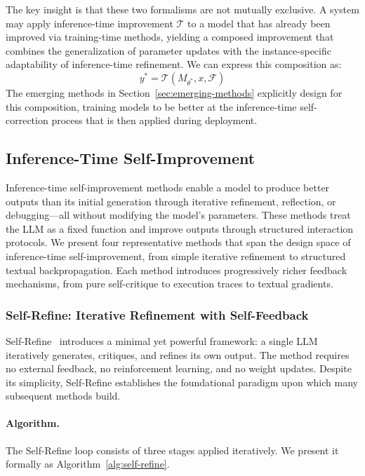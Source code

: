 The key insight is that these two formalisms are not mutually exclusive. A system may apply inference-time improvement $\mathcal{T}$ to a model that has already been improved via training-time methods, yielding a composed improvement that combines the generalization of parameter updates with the instance-specific adaptability of inference-time refinement. We can express this composition as:
\begin{equation}
    y^{*} = \mathcal{T}(M_{\theta^{*}}, x, \mathcal{F})
    \label{eq:composed-improvement}
\end{equation}
The emerging methods in Section~\ref{sec:emerging-methods} explicitly design for this composition, training models to be better at the inference-time self-correction process that is then applied during deployment.


\subsection{Inference-Time Self-Improvement}
\label{sec:inference-time}

Inference-time self-improvement methods enable a model to produce better outputs than its initial generation through iterative refinement, reflection, or debugging---all without modifying the model's parameters. These methods treat the LLM as a fixed function and improve outputs through structured interaction protocols. We present four representative methods that span the design space of inference-time self-improvement, from simple iterative refinement to structured textual backpropagation. Each method introduces progressively richer feedback mechanisms, from pure self-critique to execution traces to textual gradients.


\subsubsection{Self-Refine: Iterative Refinement with Self-Feedback}
\label{sec:self-refine}

Self-Refine~\citep{madaan2023selfrefine} introduces a minimal yet powerful framework: a single LLM iteratively generates, critiques, and refines its own output. The method requires no external feedback, no reinforcement learning, and no weight updates. Despite its simplicity, Self-Refine establishes the foundational paradigm upon which many subsequent methods build.

\paragraph{Algorithm.}
The Self-Refine loop consists of three stages applied iteratively. We present it formally as Algorithm~\ref{alg:self-refine}.

